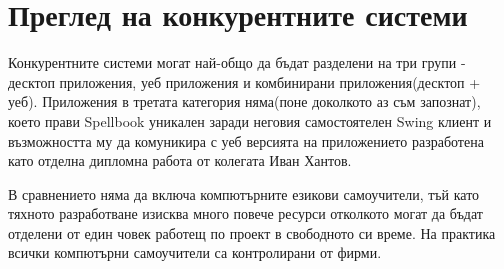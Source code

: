 \section{Преглед на конкурентните системи}
Конкурентните системи могат най-общо да бъдат разделени на три групи -
десктоп приложения, уеб приложения и комбинирани приложения(десктоп +
уеб). Приложения в третата категория няма(поне доколкото аз съм
запознат), което прави Spellbook уникален заради неговия самостоятелен
Swing клиент и възможността му да комуникира с уеб версията на
приложението разработена като отделна дипломна работа от колегата Иван
Хантов. 

В сравнението няма да включа компютърните езикови самоучители, тъй
като тяхното разработване изисква много повече ресурси отколкото могат
да бъдат отделени от един човек работещ по проект в свободното си
време. На практика всички компютърни самоучители са контролирани от
фирми. 

